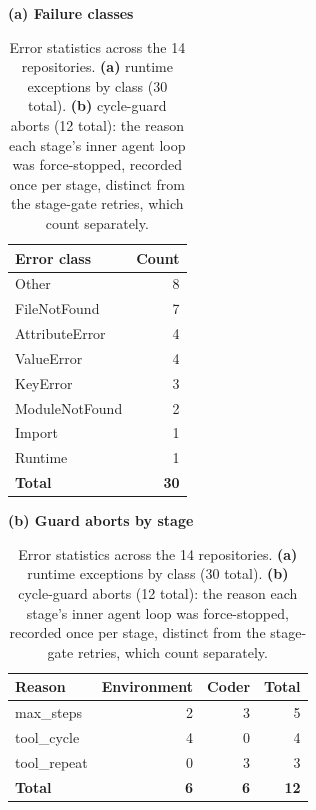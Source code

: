 \documentclass{article}
\begin{document}
\pagestyle{empty}

\begin{table}[t]
\centering
\footnotesize
\begin{minipage}[t]{0.42\linewidth}\centering
\textbf{(a) Failure classes}\\[2pt]
\begin{tabular}{@{}lr@{}}
\toprule
Error class & Count \\
\midrule
Other & 8 \\
FileNotFound & 7 \\
AttributeError & 4 \\
ValueError & 4 \\
KeyError & 3 \\
ModuleNotFound & 2 \\
Import & 1 \\
Runtime & 1 \\
\midrule
\textbf{Total} & \textbf{30} \\
\bottomrule
\end{tabular}
\end{minipage}\hfill
\begin{minipage}[t]{0.50\linewidth}\centering
\textbf{(b) Guard aborts by stage}\\[2pt]
\begin{tabular}{@{}lrrr@{}}
\toprule
Reason & Environment & Coder & Total \\
\midrule
max\_steps & 2 & 3 & 5 \\
tool\_cycle & 4 & 0 & 4 \\
tool\_repeat & 0 & 3 & 3 \\
\midrule
\textbf{Total} & \textbf{6} & \textbf{6} & \textbf{12} \\
\bottomrule
\end{tabular}
\end{minipage}
\caption{Error statistics across the 14 repositories. \textbf{(a)} runtime exceptions by class (30 total). \textbf{(b)} cycle-guard aborts (12 total): the reason each stage's inner agent loop was force-stopped, recorded once per stage, distinct from the stage-gate retries, which count separately.}
\label{tab:alembic-error-stats}
\end{table}
\end{document}
